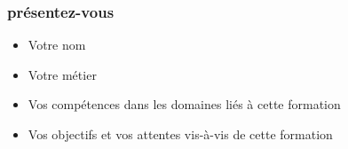 \begin{frame}
  \frametitle{présentez-vous}
  \begin{itemize}
  \item Votre nom
  \item Votre métier
  \item Vos compétences dans les domaines liés à cette formation
  \item Vos objectifs et vos attentes vis-à-vis de cette formation
  \end{itemize}
\end{frame}
